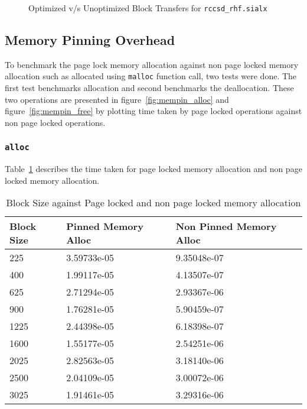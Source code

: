 \begin{figure}[h]
  
  \caption{Optimized v/s Unoptimized Block Transfers for \texttt{rccsd\_rhf.sialx}}
  \label{fig:optimized_block_transfer}
\end{figure}

\subsection{Memory Pinning Overhead}
To benchmark the page lock memory allocation against non page locked memory allocation
such as allocated using \texttt{malloc} function call, two tests were done. The
first test benchmarks allocation and second benchmarks the deallocation. These two
operations are presented in figure~\ref{fig:mempin_alloc} and figure~\ref{fig:mempin_free}
by plotting time taken by page locked operations against non page locked operations.

\subsubsection{\texttt{alloc}}
Table~\ref{tab:mempin_alloc} describes the time taken for page locked memory allocation
and non page locked memory allocation.
\begin{table}[h]
  \centering
  \begin{tabular}{l | l | l}
    \hline
    Block Size & Pinned Memory Alloc & Non Pinned Memory Alloc \\
    \hline
    225        & 3.59733e-05         & 9.35048e-07             \\
    400        & 1.99117e-05         & 4.13507e-07             \\
    625        & 2.71294e-05         & 2.93367e-06             \\
    900        & 1.76281e-05         & 5.90459e-07             \\
    1225       & 2.44398e-05         & 6.18398e-07             \\
    1600       & 1.55177e-05         & 2.54251e-06             \\
    2025       & 2.82563e-05         & 3.18140e-06             \\
    2500       & 2.04109e-05         & 3.00072e-06             \\
    3025       & 1.91461e-05         & 3.29316e-06             \\
    \hline
  \end{tabular}
  \caption{Block Size against Page locked and non page locked memory allocation}
  \label{tab:mempin_alloc}
\end{table}

